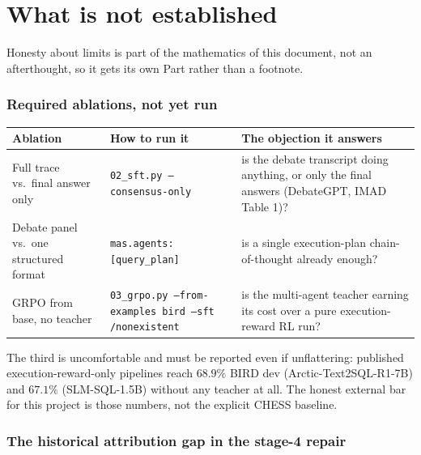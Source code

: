 \documentclass[11pt]{article}
\theoremstyle{definition}
\begin{document}
\begin{center}
\end{center}

\newpage
\part{What is not established}
\label{part:limits}

Honesty about limits is part of the mathematics of this document, not an afterthought, so it gets its own Part rather than a footnote.

\section{Required ablations, not yet run}

\begin{center}
\begin{tabular}{p{}p{}p{}}
\toprule
Ablation & How to run it & The objection it answers \\
\midrule
Full trace vs.\ final answer only & \texttt{02\_sft.py --consensus-only} & is the debate transcript doing anything, or only the final answers (DebateGPT, IMAD Table 1)? \\
Debate panel vs.\ one structured format & \texttt{mas.agents: [query\_plan]} & is a single execution-plan chain-of-thought already enough? \\
GRPO from base, no teacher & \texttt{03\_grpo.py --from-examples bird --sft /nonexistent} & is the multi-agent teacher earning its cost over a pure execution-reward RL run? \\
\bottomrule
\end{tabular}
\end{center}

The third is uncomfortable and must be reported even if unflattering: published execution-reward-only pipelines reach $68.9\%$ BIRD dev (Arctic-Text2SQL-R1-7B) and $67.1\%$ (SLM-SQL-1.5B) without any teacher at all. The honest external bar for this project is those numbers, not the explicit CHESS baseline.

\section{The historical attribution gap in the stage-4 repair}
\label{sec:attrib-recap}
\end{document}
